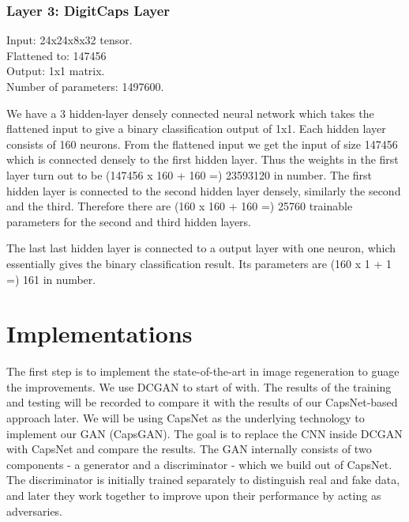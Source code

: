 \documentclass{vldb}
\begin{document}

\subsubsection{Layer 3: DigitCaps Layer} %
\label{sub:layer_3_digitcaps_layer}
\noindent Input: 24x24x8x32 tensor.
\\Flattened to: 147456
\\Output: 1x1 matrix.
\\Number of parameters: 1497600.

\par\bigskip We have a 3 hidden-layer densely connected neural network which takes the flattened input to give a binary classification output of 1x1. Each hidden layer consists of 160 neurons. From the flattened input we get the input of size 147456 which is connected densely to the first hidden layer. Thus the weights in the first layer turn out to be (147456 x 160 + 160 =)  23593120 in number. The first hidden layer is connected to the second hidden layer densely, similarly the second and the third. Therefore there are (160 x 160 + 160 =) 25760 trainable parameters for the second and third hidden layers. 
\par\bigskip The last last hidden layer is connected to a output layer with one neuron, which essentially gives the binary classification result. Its parameters are (160 x 1 + 1 =) 161 in number. 

\section{Implementations}
The first step is to implement the state-of-the-art in image regeneration to guage the improvements. We use DCGAN to start of with. The results of the training and testing will be recorded to compare it with the results of our CapsNet-based approach later. We will be using CapsNet as the underlying technology to implement our GAN (CapsGAN). The goal is to replace the CNN inside DCGAN with CapsNet and compare the results. The GAN internally consists of two components - a generator and a discriminator - which we build out of CapsNet. The discriminator is initially trained separately to distinguish real and fake data, and later they work together to improve upon their performance by acting as adversaries.
\par\bigskip
\end{document}
